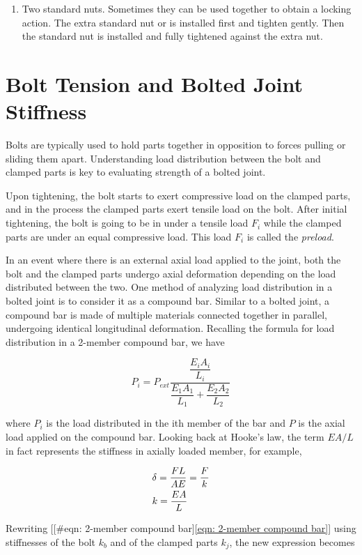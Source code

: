 \documentclass[a4paper,openany,12pt]{book}
\begin{document}
{{\begin{enumerate}
\item Two standard nuts. Sometimes they can be used together to obtain a
locking action. The extra standard nut or is installed first and
tighten gently. Then the standard nut is installed and fully
tightened against the extra nut.
\end{enumerate}

\section{Bolt Tension and Bolted Joint Stiffness}
\label{bolt-tension-and-bolted-joint-stiffness}
Bolts are typically used to hold parts together in opposition to forces
pulling or sliding them apart. Understanding load distribution between
the bolt and clamped parts is key to evaluating strength of a bolted
joint.

Upon tightening, the bolt starts to exert compressive load on the
clamped parts, and in the process the clamped parts exert tensile load
on the bolt. After initial tightening, the bolt is going to be in under
a tensile load \(F_i\) while the clamped parts are under an equal
compressive load. This load \(F_i\) is called the \emph{preload}.

In an event where there is an external axial load applied to the joint,
both the bolt and the clamped parts undergo axial deformation depending
on the load distributed between the two. One method of analyzing load
distribution in a bolted joint is to consider it as a compound bar.
Similar to a bolted joint, a compound bar is made of multiple materials
connected together in parallel, undergoing identical longitudinal
deformation. Recalling the formula for load distribution in a 2-member
compound bar, we have

$$ P_i = P_{ext}\frac{\dfrac{E_iA_i}{L_i}}{\dfrac{E_1A_1}{L_1} + \dfrac{E_2A_2}{L_2}}$$

where \(P_i\) is the load distributed in the ith member of the bar and \(P\)
is the axial load applied on the compound bar. Looking back at Hooke's
law, the term \(EA/L\) in fact represents the stiffness in axially loaded
member, for example,

$$\begin{gathered}
  \delta  = \frac{FL}{AE} = \frac{F}{k} \hfill \\
  k = \frac{EA}{L} \hfill \\ 
\end{gathered}$$

Rewriting [[\#eqn: 2-member compound bar]\ref{eqn: 2-member compound bar}]
using stiffnesses of the bolt \(k_b\) and of the clamped parts \(k_j\), the
new expression becomes


}}
\end{document}
